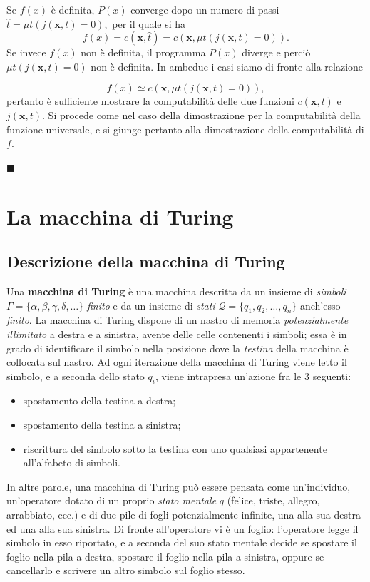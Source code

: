 \documentclass[10pt]{\classname}
\theoremstyle{definition}
\theoremstyle{definition}
\theoremstyle{definition}
\theoremstyle{definition}
\begin{document}
Se $f(x)$ è definita, $P(x)$ converge dopo un numero di passi $\hat t = \mu t \left(j(\bm{x}, t) = 0\right),$ per il quale si ha
\[f(x) = c(\bm{x}, \hat t) = c(\bm{x}, \mu t \left(j(\bm{x}, t) = 0\right)).\] Se invece $f(x)$ non è definita, il programma $P(x)$ diverge e perciò $\mu t \left(j(\bm{x}, t) = 0\right)$ non è definita. In ambedue i casi siamo di fronte alla relazione

\[f(x) \simeq c(\bm{x}, \mu t \left(j(\bm{x}, t) = 0\right)),\] pertanto è sufficiente mostrare la computabilità delle due funzioni $c(\bm{x}, t)$ e $j(\bm x, t)$. Si procede come nel caso della dimostrazione per la computabilità della funzione universale, e si giunge pertanto alla dimostrazione della computabilità di $f$.

\begin{flushright}
$\blacksquare$
\end{flushright}

\chapter{La macchina di Turing}

\section{Descrizione della macchina di Turing}

Una \textbf{macchina di Turing} è una macchina descritta da un insieme di
\emph{simboli} $\Gamma = \{\alpha, \beta, \gamma, \delta, \dots\}$ \emph{finito} e da
un insieme di \emph{stati} $\mathcal{Q} = \{q_1, q_2, \dots, q_n\}$ anch'esso
\emph{finito}. La macchina di Turing dispone di un nastro di memoria
\emph{potenzialmente illimitato} a destra e a sinistra, avente delle celle
contenenti i simboli; essa è in grado di identificare il simbolo nella posizione dove la
\emph{testina} della macchina è collocata sul nastro. Ad ogni iterazione della
macchina di Turing viene letto il simbolo, e a seconda dello stato $q_i$, viene
intrapresa un'azione fra le $3$ seguenti:
\begin{itemize}
    \item spostamento della testina a destra;
    \item spostamento della testina a sinistra;
    \item riscrittura del simbolo sotto la testina con uno qualsiasi
        appartenente all'alfabeto di simboli.
\end{itemize}

In altre parole, una macchina di Turing può essere pensata come un'individuo, un'operatore dotato di un proprio \emph{stato mentale} $q$ (felice, triste, allegro, arrabbiato, ecc.) e di due pile di fogli potenzialmente infinite, una alla sua destra ed una alla sua sinistra. Di fronte all'operatore vi è un foglio: l'operatore legge il simbolo in esso riportato, e a seconda del suo stato mentale decide se spostare il foglio nella pila a destra, spostare il foglio nella pila a sinistra, oppure se cancellarlo e scrivere un altro simbolo sul foglio stesso.
\end{document}
